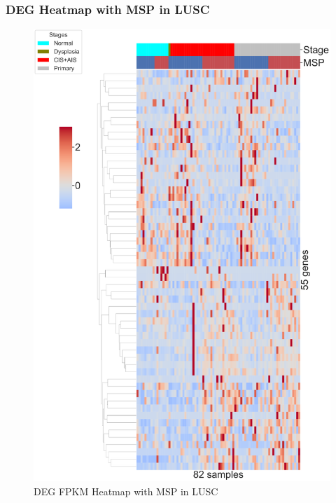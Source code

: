 \documentclass{beamer}
\begin{document}
    \begin{frame}[allowframebreaks]
        \frametitle{DEG Heatmap with MSP in LUSC}

        \begin{figure}
            \includegraphics[width=0.35 \linewidth]{figures/DEG/Cluster/STAR.FPKM.SQC.MSP-Median.pdf}
            \caption{DEG FPKM Heatmap with MSP in LUSC}
        \end{figure}
        \framebreak


\end{frame}
\end{document}
